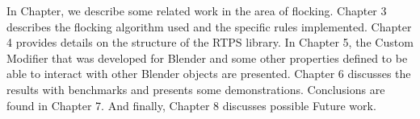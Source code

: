 
  In Chapter, we  describe some related work in the area of flocking. Chapter 3 describes the flocking algorithm used and the specific rules implemented. Chapter 4 provides details on the structure of the RTPS library. In Chapter 5, the Custom Modifier that was developed for Blender and some other properties defined to be able to interact with other Blender objects are presented. Chapter 6 discusses the results with benchmarks and presents some demonstrations. Conclusions are found in Chapter 7.  And finally, Chapter 8 discusses possible Future work. 

